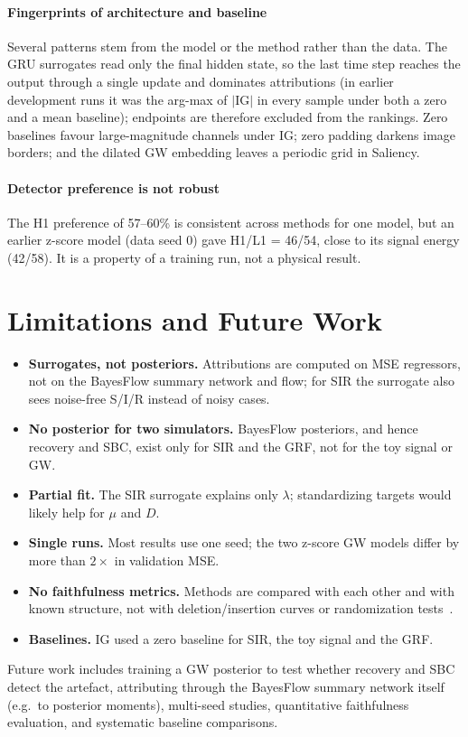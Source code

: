 \documentclass[conference]{IEEEtran}
\begin{document}
\paragraph{Fingerprints of architecture and baseline}\label{sec:fingerprints}
Several patterns stem from the model or the method rather than the data. The GRU surrogates read only the final
hidden state, so the last time step reaches the output through a single update and dominates attributions
(in earlier development runs it was the arg-max of $|$IG$|$ in every sample under both a zero and a mean baseline);
endpoints are therefore excluded from the rankings. Zero baselines favour large-magnitude channels under IG;
zero padding darkens image borders; and the dilated GW embedding leaves a periodic grid in Saliency.

\paragraph{Detector preference is not robust} The H1 preference of 57--60\% is consistent across methods for one
model, but an earlier z-score model (data seed 0) gave H1/L1 = 46/54, close to its signal energy (42/58). It is a
property of a training run, not a physical result.

\section{Limitations and Future Work}

\begin{itemize}
  \item \textbf{Surrogates, not posteriors.} Attributions are computed on MSE regressors, not on the BayesFlow
  summary network and flow; for SIR the surrogate also sees noise-free S/I/R instead of noisy cases.
  \item \textbf{No posterior for two simulators.} BayesFlow posteriors, and hence recovery and SBC, exist only for SIR and the GRF, not for the toy signal or GW.
  \item \textbf{Partial fit.} The SIR surrogate explains only $\lambda$; standardizing targets would likely help
  for $\mu$ and $D$.
  \item \textbf{Single runs.} Most results use one seed; the two z-score GW models differ by more than $2\times$
  in validation MSE.
  \item \textbf{No faithfulness metrics.} Methods are compared with each other and with known structure, not with
  deletion/insertion curves or randomization tests~\cite{adebayo2018sanity}.
  \item \textbf{Baselines.} IG used a zero baseline for SIR, the toy signal and the GRF.
\end{itemize}
Future work includes training a GW posterior to test whether recovery and SBC detect the artefact, attributing through the BayesFlow summary network itself (e.g.\ to posterior moments),
multi-seed studies, quantitative faithfulness evaluation, and systematic baseline comparisons.
\end{document}
